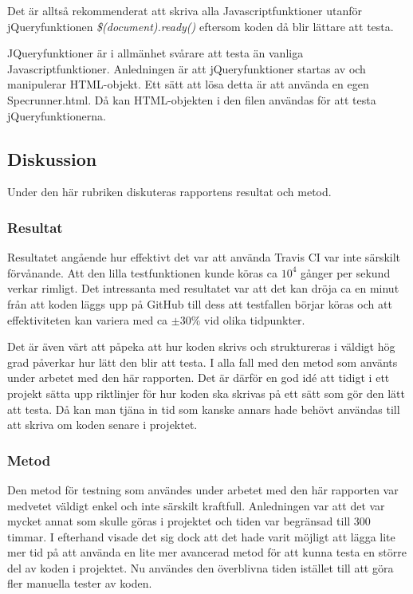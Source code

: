 Det är alltså rekommenderat att skriva alla Javascriptfunktioner utanför 
jQueryfunktionen \emph{\$(document).ready()} eftersom koden då blir 
lättare att testa.

JQueryfunktioner är i allmänhet svårare att testa än vanliga
Javascriptfunktioner. Anledningen är att jQueryfunktioner
startas av och manipulerar HTML-objekt. Ett sätt att lösa detta är
att använda en egen \textunderscore Specrunner.html. Då kan HTML-objekten i den
filen användas för att testa jQueryfunktionerna.

\subsection{Diskussion}
Under den här rubriken diskuteras rapportens resultat
och metod.

\subsubsection{Resultat}
Resultatet angående hur effektivt det var att använda Travis CI
var inte särskilt förvånande. Att den lilla testfunktionen kunde köras
ca $10^4$ gånger per sekund verkar rimligt. Det intressanta med resultatet
var att det kan dröja ca en minut från att koden läggs upp på GitHub
till dess att testfallen börjar köras och att effektiviteten
kan variera med ca $\pm 30 \%$ vid olika tidpunkter.

Det är även värt att påpeka att hur koden skrivs och struktureras
i väldigt hög grad påverkar hur lätt den blir att testa. I alla fall
med den metod som använts under arbetet med den här rapporten. Det är 
därför en god idé att tidigt i ett projekt sätta upp riktlinjer för hur
koden ska skrivas på ett sätt som gör den lätt att testa. Då kan man
tjäna in tid som kanske annars hade behövt användas till att 
skriva om koden senare i projektet.

\subsubsection{Metod}
Den metod för testning som användes under arbetet med den här rapporten var
medvetet väldigt enkel och inte särskilt kraftfull. Anledningen var
att det var mycket annat som skulle göras i projektet och tiden var
begränsad till 300 timmar. I efterhand visade det sig dock att det hade varit 
möjligt att lägga lite mer tid på att använda en lite
mer avancerad metod för att kunna testa en större
del av koden i projektet. Nu användes den överblivna tiden istället till
att göra fler manuella tester av koden.


